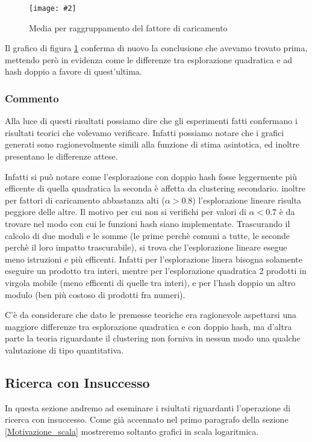 \documentclass{article}
\newcommand{\image}[3][1]{
	\centering
	\texttt{[image: \#2]}
	\caption{#3}
}
\begin{document}
\begin{figure}[H]
\image[0.75]{Successo_Confronto_barre_scala_logaritmica}{Media per raggruppamento del fattore di caricamento}
\label{fig:Successo_Confronto_barre_scala_logaritmica}
\end{figure}

Il grafico di figura \ref{fig:Successo_Confronto_barre_scala_logaritmica} conferma di nuovo la conclusione che avevamo trovato prima, mettendo però in evidenza come le differenze tra esplorazione quadratica e ad hash doppio a favore di quest'ultima.

\subsubsection{Commento}
Alla luce di questi risultati possiamo dire che gli esperimenti fatti confermano i risultati teorici che volevamo verificare. Infatti possiamo notare che i grafici generati sono ragionevolmente simili alla funzione di stima asintotica, ed inoltre presentano le differenze attese.

Infatti si può notare come l'esplorazione con doppio hash fosse leggermente più efficente di quella quadratica la seconda è affetta da clustering secondario. inoltre per fattori di caricamento abbastanza alti ($\alpha > 0.8$) l'esplorazione lineare risulta peggiore delle altre. Il motivo per cui non si verifichi per valori di $\alpha < 0.7$ è da trovare nel modo con cui le funzioni hash siano implementate. Trascurando il calcolo di due moduli e le somme (le prime perchè comuni a tutte, le seconde perchè il loro impatto trascurabile), si trova che l'esplorazione lineare esegue meno istruzioni e più efficenti. Infatti per l'esplorazione linera bisogna solamente eseguire un prodotto tra interi, mentre per l'esplorazione quadratica 2 prodotti in virgola mobile (meno efficenti di quelle tra interi), e per l'hash doppio un altro modulo (ben più costoso di prodotti fra numeri).

C'è da considerare che dato le premesse teoriche era ragionevole aspettarsi una maggiore differenze tra esplorazione quadratica e con doppio hash, ma d'altra parte la teoria riguardante il clustering non forniva in nessun modo una qualche valutazione di tipo quantitativa.

\subsection{Ricerca con Insuccesso}
In questa sezione andremo ad eseminare i rsiultati riguardanti l'operazione di ricerca con insuccesso. Come già accennato nel primo paragrafo della sezione \ref{Motivazione_scala} mostreremo soltanto grafici in scala logaritmica.
\end{document}
